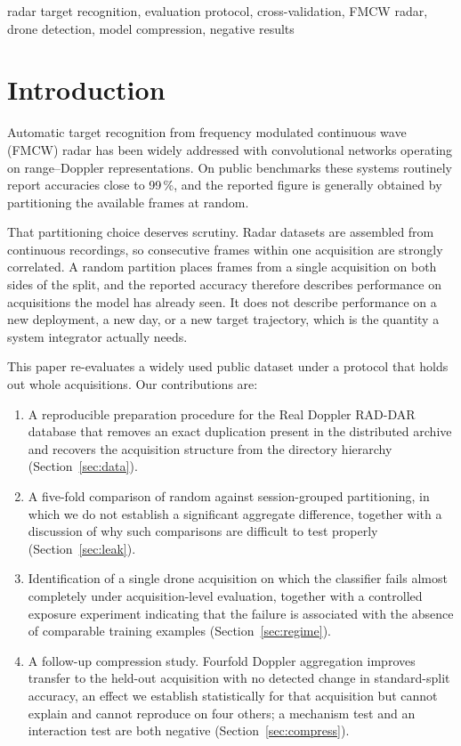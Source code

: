 \documentclass[conference]{IEEEtran}
\begin{document}
\begin{IEEEkeywords}
radar target recognition, evaluation protocol, cross-validation, FMCW radar,
drone detection, model compression, negative results
\end{IEEEkeywords}

\section{Introduction}

Automatic target recognition from frequency modulated continuous wave (FMCW)
radar has been widely addressed with convolutional networks operating on
range--Doppler representations. On public benchmarks these systems routinely
report accuracies close to 99\,\%, and the reported figure is generally
obtained by partitioning the available frames at random.

That partitioning choice deserves scrutiny. Radar datasets are assembled
from continuous recordings, so consecutive frames within one acquisition are
strongly correlated. A random partition places frames from a single
acquisition on both sides of the split, and the reported accuracy therefore
describes performance on acquisitions the model has already seen. It does
not describe performance on a new deployment, a new day, or a new target
trajectory, which is the quantity a system integrator actually needs.

This paper re-evaluates a widely used public dataset under a protocol that
holds out whole acquisitions. Our contributions are:

\begin{enumerate}
\item A reproducible preparation procedure for the Real Doppler RAD-DAR
database that removes an exact duplication present in the distributed
archive and recovers the acquisition structure from the directory hierarchy
(Section~\ref{sec:data}).
\item A five-fold comparison of random against session-grouped
partitioning, in which we do not establish a significant aggregate
difference, together with a discussion of why such comparisons are difficult
to test properly (Section~\ref{sec:leak}).
\item Identification of a single drone acquisition on which the classifier
fails almost completely under acquisition-level evaluation, together with a
controlled exposure experiment indicating that the failure is associated with
the absence of comparable training examples (Section~\ref{sec:regime}).
\item A follow-up compression study. Fourfold Doppler aggregation improves
transfer to the held-out acquisition with no detected change in
standard-split accuracy, an effect we establish statistically for that
acquisition but cannot explain and cannot reproduce on four others; a
mechanism test and an interaction test are both negative
(Section~\ref{sec:compress}).
\end{enumerate}
\end{document}
